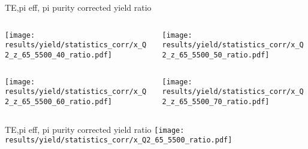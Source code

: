 \begin{frame}{TE,pi eff, pi purity corrected yield ratio}
\begin{columns}
\begin{column}[T]{0.5\textwidth}
\texttt{[image: results/yield/statistics\_corr/x\_Q2\_z\_65\_5500\_40\_ratio.pdf]}
\end{column}
\begin{column}[T]{0.5\textwidth}
\texttt{[image: results/yield/statistics\_corr/x\_Q2\_z\_65\_5500\_50\_ratio.pdf]}
\end{column}
\end{columns}
\begin{columns}
\begin{column}[T]{0.5\textwidth}
\texttt{[image: results/yield/statistics\_corr/x\_Q2\_z\_65\_5500\_60\_ratio.pdf]}
\end{column}
\begin{column}[T]{0.5\textwidth}
\texttt{[image: results/yield/statistics\_corr/x\_Q2\_z\_65\_5500\_70\_ratio.pdf]}
\end{column}
\end{columns}
\end{frame}
\begin{frame}{TE,pi eff, pi purity corrected yield ratio}
\texttt{[image: results/yield/statistics\_corr/x\_Q2\_65\_5500\_ratio.pdf]}
\end{frame}
